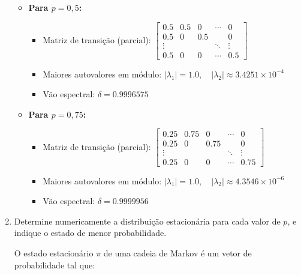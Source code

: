 \begin{enumerate}
\begin{resposta}
\begin{itemize}
            \item \textbf{Para $p = 0{,}5$:}
            \begin{itemize}
                \item Matriz de transição (parcial):
                $
                \begin{bmatrix}
                0.5 & 0.5 & 0    & \cdots & 0 \\
                0.5 & 0   & 0.5  &        & 0 \\
                \vdots &     &     & \ddots & \vdots \\
                0.5 & 0   & 0    & \cdots & 0.5
                \end{bmatrix}
                $
                \item Maiores autovalores em módulo:
                $ |\lambda_1| = 1.0, \quad |\lambda_2| \approx 3.4251 \times 10^{-4} $
                \item Vão espectral:
                $ \boxed{\delta = 0.9996575} $
            \end{itemize}
        
            \item \textbf{Para $p = 0{,}75$:}
            \begin{itemize}
                \item Matriz de transição (parcial):
                $
                \begin{bmatrix}
                0.25 & 0.75 & 0    & \cdots & 0 \\
                0.25 & 0    & 0.75 &        & 0 \\
                \vdots &     &     & \ddots & \vdots \\
                0.25 & 0    & 0    & \cdots & 0.75
                \end{bmatrix}
                $
                \item Maiores autovalores em módulo:
                $ |\lambda_1| = 1.0, \quad |\lambda_2| \approx 4.3546 \times 10^{-6} $
                \item Vão espectral:
                $ \boxed{\delta = 0.9999956} $
            \end{itemize}
        \end{itemize}
        


    \end{resposta}
    \item Determine numericamente a distribuição estacionária para cada valor de $p$, e indique o estado de menor probabilidade.
    \begin{resposta}
        O estado estacionário $\pi$ de uma cadeia de Markov é um vetor de probabilidade tal que:


\end{resposta}
\end{enumerate}
